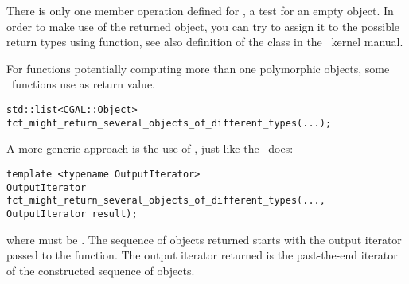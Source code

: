 There is only one member operation defined for , a test for
an empty object. In order to make use of the returned object, 
you can try to assign it to the possible return types using 
function, see also definition of the class  in the 
\cgal\ kernel manual. 

For functions potentially computing more than one polymorphic objects, some 
\cgal\ functions use  as return value. 
\begin{verbatim}
std::list<CGAL::Object>
fct_might_return_several_objects_of_different_types(...);
\end{verbatim}

A more generic approach is the use of , just like
the \stl\ does:
\begin{verbatim}
template <typename OutputIterator>
OutputIterator
fct_might_return_several_objects_of_different_types(..., OutputIterator result);
\end{verbatim}
where  must be .
The sequence of objects returned starts with the output iterator passed to
the function. The output iterator returned is the past-the-end iterator of 
the constructed sequence of objects. 

